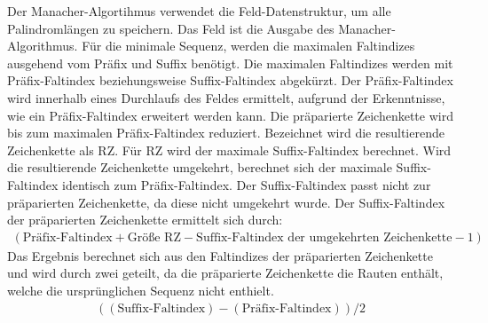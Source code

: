 Der Manacher-Algortihmus verwendet die Feld-Datenstruktur, um alle Palindromlängen zu speichern. Das Feld ist die Ausgabe des Manacher-Algorithmus. Für die minimale Sequenz, werden die maximalen Faltindizes ausgehend vom Präfix und Suffix benötigt. Die maximalen Faltindizes werden mit Präfix-Faltindex beziehungsweise Suffix-Faltindex abgekürzt. Der Präfix-Faltindex wird innerhalb eines Durchlaufs des Feldes ermittelt, aufgrund der Erkenntnisse, wie ein Präfix-Faltindex erweitert werden kann. Die präparierte Zeichenkette wird bis zum maximalen Präfix-Faltindex reduziert. Bezeichnet wird die resultierende Zeichenkette als RZ. Für RZ wird der maximale Suffix-Faltindex berechnet. Wird die resultierende Zeichenkette umgekehrt, berechnet sich der maximale Suffix-Faltindex identisch zum Präfix-Faltindex. Der  Suffix-Faltindex passt nicht zur präparierten Zeichenkette, da diese nicht umgekehrt wurde. Der Suffix-Faltindex der präparierten Zeichenkette ermittelt sich durch:
\begin{align}
(\text{Präfix-Faltindex}+\text{Größe RZ} - \text{Suffix-Faltindex der umgekehrten Zeichenkette} - 1)
\end{align}
Das Ergebnis berechnet sich aus den Faltindizes der präparierten Zeichenkette und wird durch zwei geteilt, da die präparierte Zeichenkette die Rauten enthält, welche die ursprünglichen Sequenz nicht enthielt.
\begin{align}
((\text{Suffix-Faltindex}) - (\text{Präfix-Faltindex})) / 2
\end{align}
%
